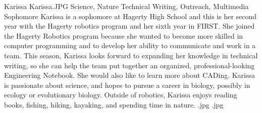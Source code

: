 \insertbio
{Karissa}
{Karissa.JPG}
{Science, Nature}
{Technical Writing, Outreach, Multimedia}
{Sophomore}
{
Karissa is a sophomore at Hagerty High School and this is her second year with the Hagerty robotics program and her sixth year in FIRST. She joined the Hagerty Robotics program because she wanted to become more skilled in computer programming and to develop her ability to communicate and work in a team. This season, Karissa looks forward to expanding her knowledge in technical writing, so she can help the team put together an organized, professional-looking Engineering Notebook. She would also like to learn more about CADing. Karissa is passionate about science, and hopes to pursue a career in biology, possibly in ecology or evolutionary biology. Outside of robotics, Karissa enjoys reading books, fishing, hiking, kayaking, and spending time in nature.
}
{.jpg}
{.jpg}